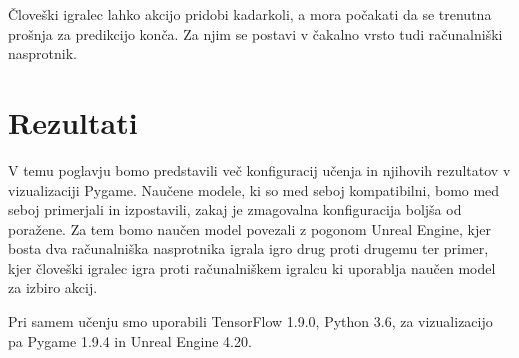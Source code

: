 \documentclass[a4paper, 12pt]{book}
\begin{document}
Človeški igralec lahko akcijo pridobi kadarkoli, a mora počakati da se trenutna prošnja za predikcijo konča. Za njim se postavi v čakalno vrsto tudi računalniški nasprotnik.
\chapter{Rezultati}
\label{chrezultati}

V temu poglavju bomo predstavili več konfiguracij učenja in njihovih rezultatov v vizualizaciji Pygame.
Naučene modele, ki so med seboj kompatibilni, bomo med seboj primerjali in izpostavili, zakaj je zmagovalna konfiguracija boljša od poražene.
Za tem bomo naučen model povezali z pogonom Unreal Engine, kjer bosta dva računalniška nasprotnika igrala igro drug proti drugemu ter primer, kjer človeški igralec igra proti računalniškem igralcu ki uporablja naučen model za izbiro akcij.

Pri samem učenju smo uporabili  TensorFlow 1.9.0, Python 3.6, za vizualizacijo pa  Pygame 1.9.4 in Unreal Engine 4.20.
\end{document}
